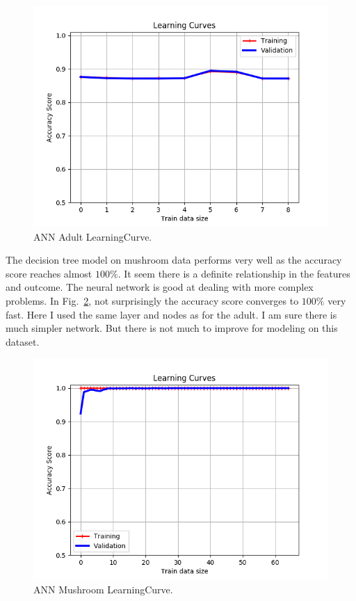 \documentclass[         %
aps,                    %
prl,                    %
showpacs,               %
superscriptaddress,    %
nofootinbib,            %
twocolumn,             %
showkeys,               %
preprintnumbers,        %
floatfix               %
]{revtex4-1}               %
\begin{document}
\begin{figure}[h!]
  \centering \includegraphics[width=\linewidth]{../ANN_adult_LearningCurve.png}
  \caption{ANN Adult LearningCurve.\label{fig:ANN_lc_adult}}
\end{figure}

The decision tree model on mushroom data performs very well as the accuracy score reaches almost $100\%$. 
It seem there is a definite relationship in the features and outcome.
The neural network is good at dealing with more complex problems.
In Fig.~\ref{fig:ANN_lc_mush}, not surprisingly the accuracy score converges to $100\%$ very fast. 
Here I used the same layer and nodes as for the adult. 
I am sure there is much simpler network.
But there is not much to improve for modeling on this dataset.
\begin{figure}[h!]
  \centering \includegraphics[width=\linewidth]{../ANN_mush_LearningCurve.png}
  \caption{ANN Mushroom LearningCurve.\label{fig:ANN_lc_mush}}
\end{figure}
\end{document}
